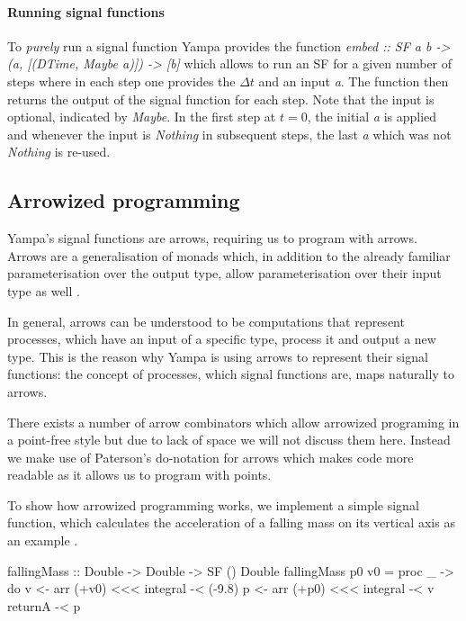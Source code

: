 \paragraph{Running signal functions}
To \textit{purely} run a signal function Yampa provides the function \textit{embed :: SF a b -> (a, [(DTime, Maybe a)]) -> [b]} which allows to run an SF for a given number of steps where in each step one provides the $\Delta t$ and an input \textit{a}. The function then returns the output of the signal function for each step. Note that the input is optional, indicated by \textit{Maybe}. In the first step at $t = 0$, the initial \textit{a} is applied and whenever the input is \textit{Nothing} in subsequent steps, the last \textit{a} which was not \textit{Nothing} is re-used.

\subsection{Arrowized programming}
Yampa's signal functions are arrows, requiring us to program with arrows. Arrows are a generalisation of monads which, in addition to the already familiar parameterisation over the output type, allow parameterisation over their input type as well \cite{hughes_generalising_2000, hughes_programming_2005}.

In general, arrows can be understood to be computations that represent processes, which have an input of a specific type, process it and output a new type. This is the reason why Yampa is using arrows to represent their signal functions: the concept of processes, which signal functions are, maps naturally to arrows.

There exists a number of arrow combinators which allow arrowized programing in a point-free style but due to lack of space we will not discuss them here. Instead we make use of Paterson's do-notation for arrows \cite{paterson_new_2001} which makes code more readable as it allows us to program with points.

To show how arrowized programming works, we implement a simple signal function, which calculates the acceleration of a falling mass on its vertical axis as an example \cite{perez_testing_2017}.

\begin{HaskellCode}
fallingMass :: Double -> Double -> SF () Double
fallingMass p0 v0 = proc _ -> do
  v <- arr (+v0) <<< integral -< (-9.8)
  p <- arr (+p0) <<< integral -< v
  returnA -< p
\end{HaskellCode}

